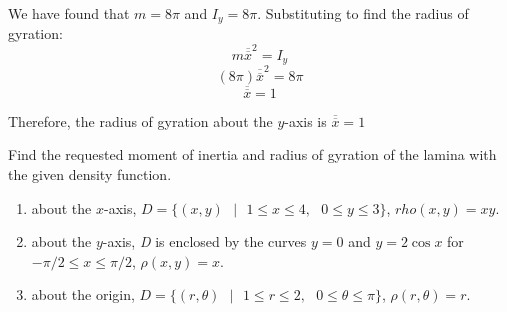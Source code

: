 We have found that $m = 8\pi$ and $I_y = 8\pi$. Substituting to find the radius
of gyration:
$$m\overline{\overline{x}}^2 = I_y$$
$$(8\pi)\overline{\overline{x}}^2 = 8\pi$$
$$\overline{\overline{x}} = 1$$

Therefore, the radius of gyration about the $y$-axis is $\overline{\overline{x}
} = 1$

\begin{Exercise}[title = {Moments of Inertia and Radii of Gyration}, label = 
moment]
Find the requested moment of inertia and radius of gyration of the lamina with 
the given density function. 
\begin{enumerate}
\item about the $x$-axis, $\textit{D} = \{(x, y)\text{ }|\text{ } 1 \leq x \leq
4,\text{ } 0 \leq y \leq 3\}$, $rho(x, y) = xy$.
\item about the $y$-axis, \textit{D} is enclosed by the curves $y = 0$ and $y =
2\cos{x}$ for $-\pi/2 \leq x \leq \pi/2$, $\rho(x, y) = x$.
\item about the origin, $\textit{D} = \{(r, \theta)\text{ }|\text{ }1 \leq r 
\leq 2, \text{ }0 \leq \theta \leq \pi\}$, $\rho(r, \theta) = r$. 
\end{enumerate}
\vspace{100mm}
\end{Exercise}

